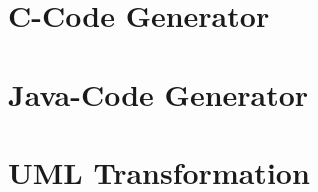 \documentclass[12pt,ngerman, a4paper]{book}
\begin{document}
\chapter{C-Code Generator}
\label{sec:CCodeGenerator}



\chapter{Java-Code Generator}
\label{sec:JavaCodeGenerator}






\chapter{UML Transformation}
\label{sec:UMLTransformation}


%

%
\end{document}
